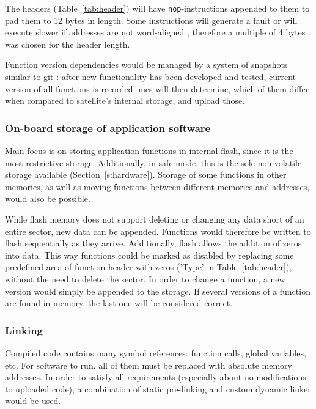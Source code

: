 The headers (Table~\ref{tab:header}) will have \texttt{nop}-instructions appended to them to pad them to 12 bytes in length. Some instructions will generate a fault or will execute slower if addresses are not word-aligned \cite[Section~3.3.5]{STMicroelectronics2017}, therefore a multiple of 4 bytes was chosen for the header length.

Function version dependencies would be managed by a system of snapshots similar to git \cite[Chapter~1.3]{Chacon2018}: after new functionality has been developed and tested, current version of all functions is recorded. \Gls{mcs} will then determine, which of them differ when compared to satellite's internal storage, and upload those.

\subsubsection{On-board storage of application software}

Main focus is on storing application functions in internal flash, since it is the most restrictive storage. Additionally, in safe mode, this is the sole non-volatile storage available (Section~\ref{s:hardware}). Storage of some functions in other memories, as well as moving functions between different memories and addresses, would also be possible.

While flash memory does not support deleting or changing any data short of an entire sector, new data can be appended. Functions would therefore be written to flash sequentially as they arrive. Additionally, flash allows the addition of zeros into data. This way functions could be marked as disabled by replacing some predefined area of function header with zeros ('Type' in Table~\ref{tab:header}), without the need to delete the sector. In order to change a function, a new version would simply be appended to the storage. If several versions of a function are found in memory, the last one will be considered correct.

\subsubsection{Linking}

Compiled code contains many symbol references: function calls, global variables, etc. For software to run, all of them must be replaced with absolute memory addresses. In order to satisfy all requirements (especially about no modifications to uploaded code), a combination of static pre-linking and custom dynamic linker would be used.

